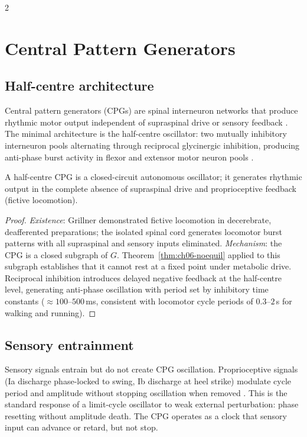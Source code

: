 \begin{multicols}{2}

\section{Central Pattern Generators}
\label{sec:ch06-cpg}

\subsection{Half-centre architecture}

Central pattern generators (CPGs) are spinal interneuron networks that produce
rhythmic motor output independent of supraspinal drive or sensory feedback
\citep{grillner1985,grillner2003}.  The minimal architecture is the
half-centre oscillator: two mutually inhibitory interneuron pools alternating
through reciprocal glycinergic inhibition, producing anti-phase burst activity
in flexor and extensor motor neuron pools \citep{marder2001,kiehn2016}.

\begin{theorem}
\label{thm:ch06-cpg}
A half-centre CPG is a closed-circuit autonomous oscillator; it generates
rhythmic output in the complete absence of supraspinal drive and proprioceptive
feedback (fictive locomotion).
\end{theorem}

\begin{proof}
\emph{Existence}: Grillner \citep{grillner1985} demonstrated fictive
locomotion in decerebrate, deafferented preparations; the isolated spinal cord
generates locomotor burst patterns with all supraspinal and sensory inputs
eliminated.  \emph{Mechanism}: the CPG is a closed subgraph of $G$.
Theorem~\ref{thm:ch06-noequil} applied to this subgraph establishes that it
cannot rest at a fixed point under metabolic drive.  Reciprocal inhibition
introduces delayed negative feedback at the half-centre level, generating
anti-phase oscillation with period set by inhibitory time constants
($\approx 100$--$500$\,ms, consistent with locomotor cycle periods of
$0.3$--$2$\,s for walking and running).
\end{proof}

\subsection{Sensory entrainment}

Sensory signals entrain but do not create CPG oscillation.  Proprioceptive
signals (Ia discharge phase-locked to swing, Ib discharge at heel strike)
modulate cycle period and amplitude without stopping oscillation when removed
\citep{pearson2004}.  This is the standard response of a limit-cycle oscillator
to weak external perturbation: phase resetting without amplitude death.  The
CPG operates as a clock that sensory input can advance or retard, but not
stop.


\end{multicols}
